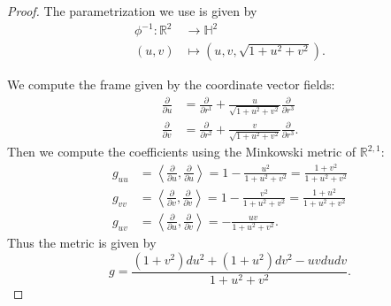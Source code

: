 \documentclass{report}
\begin{document}
    \begin{proof}
    The parametrization we use is given by
    \begin{align*}
        \phi^{-1}: \mathbb R^2 &\to \mathbb H^2\\
        (u,v) &\mapsto (u, v, \sqrt{1 + u^2 + v^2}).
    \end{align*}
    
        We compute the frame given by the coordinate vector fields:
        \begin{align*}
            \frac{\partial}{\partial u} &= \frac{\partial}{\partial r^1} + \frac{u}{\sqrt{1 + u^2 + v^2}} \frac{\partial}{\partial r^3}\\
            \frac{\partial}{\partial v} &= \frac{\partial}{\partial r^2} + \frac{v}{\sqrt{1 + u^2 + v^2}} \frac{\partial}{\partial r^3}.
        \end{align*}
        Then we compute the coefficients using the Minkowski metric of $\mathbb R^{2,1}$:
    \begin{align*}
        g_{uu} &= \left\langle \frac{\partial}{\partial u}, \frac{\partial}{\partial u} \right\rangle = 1 - \frac{u^2}{1 + u^2 + v^2} = \frac{1 + v^2}{1 + u^2 + v^2}\\
        g_{vv} &= \left\langle \frac{\partial}{\partial v}, \frac{\partial}{\partial v} \right\rangle = 1 - \frac{v^2}{1 + u^2 + v^2} = \frac{1 + u^2}{1 + u^2 + v^2}\\
        g_{uv} &= \left\langle \frac{\partial}{\partial u}, \frac{\partial}{\partial v} \right\rangle = - \frac{uv}{1 + u^2 + v^2}.
    \end{align*}
    Thus the metric is given by
    \[
    g = \frac{(1 + v^2) du^2 + (1 + u^2) dv^2 - uv du dv}{1 + u^2 + v^2}.
    \]
    \end{proof}
\end{document}
